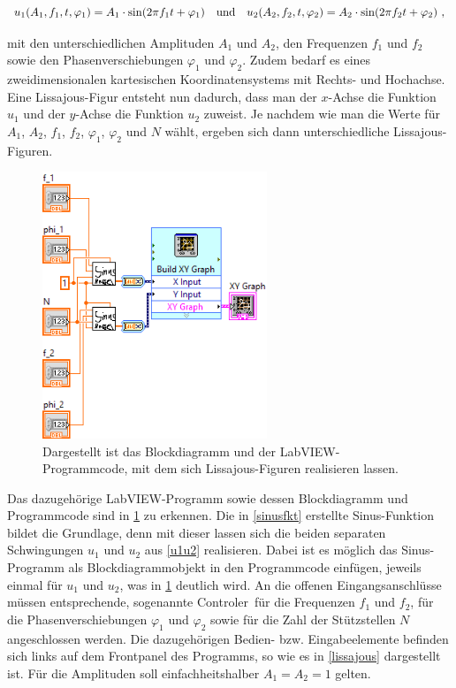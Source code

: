\documentclass[
a4paper,
12pt,
pagesize,
ngerman
]{scrartcl}
\begin{document}
	\begin{equation} \label{u1u2}
	u_1(A_1,f_1,t,\varphi_1) = A_1 \cdot \sin(2\pi f_1 t + \varphi_1) \ \ \ \textnormal{und} \ \ \ u_2(A_2,f_2,t,\varphi_2) = A_2 \cdot \sin(2\pi f_2 t + \varphi_2) \ ,
	\end{equation}
	
	\noindent mit den unterschiedlichen Amplituden $A_1$ und $A_2$, den Frequenzen $f_1$ und $f_2$ sowie den Phasenverschiebungen $\varphi_1$ und $\varphi_2$. Zudem bedarf es eines zweidimensionalen kartesischen Koordinatensystems mit Rechts- und Hochachse. Eine Lissajous-Figur entsteht nun dadurch, dass man der $x$-Achse die Funktion $u_1$ und der $y$-Achse die Funktion $u_2$ zuweist. Je nachdem wie man die Werte für $A_1$, $A_2$, $f_1$, $f_2$, $\varphi_1$, $\varphi_2$ und $N$ wählt, ergeben sich dann unterschiedliche Lissajous-Figuren.
	
	\begin{figure}[H]
		\centering
		\includegraphics[width=0.6\textwidth]{EIRE2018Dateien/Tag1/lissajous-bilder/Lissajousd} %
		\caption{Dargestellt ist das Blockdiagramm und der LabVIEW-Programmcode, mit dem sich Lissajous-Figuren realisieren lassen.}
		\label{lissajousprogrammcode}
	\end{figure}

	\noindent Das dazugehörige LabVIEW-Programm sowie dessen Blockdiagramm und Programmcode sind in \cref{lissajousprogrammcode} zu erkennen. Die in \cref{sinusfkt} erstellte Sinus-Funktion bildet die Grundlage, denn mit dieser lassen sich die beiden separaten Schwingungen $u_1$ und $u_2$ aus \cref{u1u2} realisieren. Dabei ist es möglich das Sinus-Programm als Blockdiagrammobjekt in den Programmcode einfügen, jeweils einmal für $u_1$ und $u_2$, was in \cref{lissajousprogrammcode} deutlich wird. An die offenen Eingangsanschlüsse müssen entsprechende, sogenannte \glqq Controler\grqq\ für die Frequenzen $f_1$ und $f_2$, für die Phasenverschiebungen $\varphi_1$ und $\varphi_2$ sowie für die Zahl der Stützstellen $N$ angeschlossen werden. Die dazugehörigen Bedien- bzw. Eingabeelemente befinden sich links auf dem Frontpanel des Programms, so wie es in \cref{lissajous} dargestellt ist. Für die Amplituden soll einfachheitshalber $A_1 = A_2 = 1$ gelten.
\end{document}
